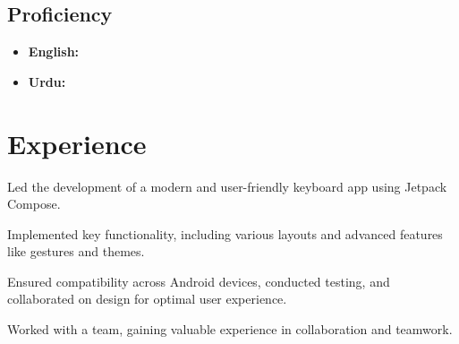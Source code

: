 \documentclass[bold]{deedy-resume-openfont}
\begin{document}
\begin{minipage}[t]{0.33\textwidth}
\subsection{Proficiency}
\begin{itemize}[label=\textbullet, leftmargin=*, topsep=5pt, itemsep=-1ex]
    \item \textbf{English:} 
    \item \textbf{Urdu:} 
\end{itemize}
\sectionsep



%
%

\end{minipage} 
\hfill
\begin{minipage}[t]{0.66\textwidth} 


\section{Experience}
 
\vspace{10pt} %
\begin{tightemize}
\item Led the development of a modern and user-friendly keyboard app using Jetpack Compose.
\item Implemented key functionality, including various layouts and advanced features like gestures and themes.
\item Ensured compatibility across Android devices, conducted testing, and collaborated on design for optimal user experience.
\item Worked with a team, gaining valuable experience in collaboration and teamwork.
\end{tightemize}



\end{minipage}
\end{document}
